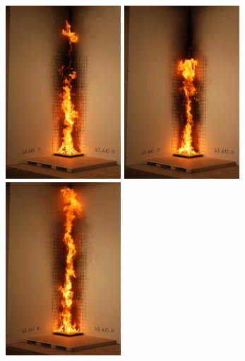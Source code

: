 \documentclass[twoside]{uocthesis}
\begin{document}
\begin{figure}[p]
	\includegraphics[width=1.7in]{../Figures/GBGAS10_IMG_2049}
	\includegraphics[width=1.7in]{../Figures/GBGAS10_IMG_2050} 
	\includegraphics[width=1.7in]{../Figures/GBGAS10_IMG_2051} \\


\end{figure}
\end{document}
